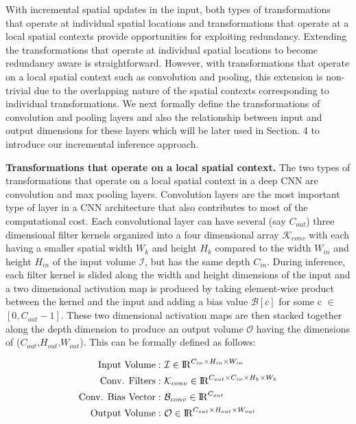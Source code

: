 With incremental spatial updates in the input, both types of transformations that operate at individual spatial locations and transformations that operate at a local spatial contexts provide opportunities for exploiting redundancy. Extending the transformations that operate at individual spatial locations to become redundancy aware is straightforward. However, with transformations that operate on a local spatial context such as convolution and pooling, this extension is non-trivial due to the overlapping nature of the spatial contexts corresponding to individual transformations. We next formally define the transformations of convolution and pooling layers and also the relationship between input and output dimensions for these layers which will be later used in Section. 4 to introduce our incremental inference approach.

\vspace{2mm}
\noindent \textbf{Transformations that operate on a local spatial context.} The two types of transformations that operate on a local spatial context in a deep CNN are convolution and max pooling layers. Convolution layers are the most important type of layer in a CNN architecture that also contributes to most of the computational cost. Each convolutional layer can have several (say $C_{out}$) three dimensional filter kernels organized into a four dimensional array $\mathcal{K}_{conv}$ with each having a smaller spatial width $W_k$ and height $H_k$ compared to the width $W_{in}$ and height $H_{in}$ of the input volume $\mathcal{I}$, but has the same depth $C_{in}$. During inference, each filter kernel is slided along the width and height dimensions of the input and a two dimensional activation map is produced by taking element-wise product between the kernel and the input and adding a bias value $\mathcal{B}[c]$ for some c $\in$ $[0, C_{out}-1]$. These two dimensional activation maps are then stacked together along the depth dimension to produce an output volume $\mathcal{O}$ having the dimensions of ($C_{out}$,$H_{out}$,$W_{out}$). This can be formally defined as follows:

\vspace{-2mm}
\begin{align}
\text{Input Volume}:&~ \mathcal{I} \in \mathcal{\rm I\!R}^{C_{in} \times H_{in} \times W_{in}}\\
\text{Conv. Filters}:&~ \mathcal{K}_{conv} \in \mathcal{\rm I\!R}^{C_{out} \times C_{in} \times H_{k} \times W_{k}}\\
\text{Conv. Bias Vector}:&~ \mathcal{B}_{conv} \in \mathcal{\rm I\!R}^{C_{out}}\\
\text{Output Volume}:&~ \mathcal{O} \in \mathcal{\rm I\!R}^{C_{out} \times H_{out} \times W_{out}}
\end{align}

